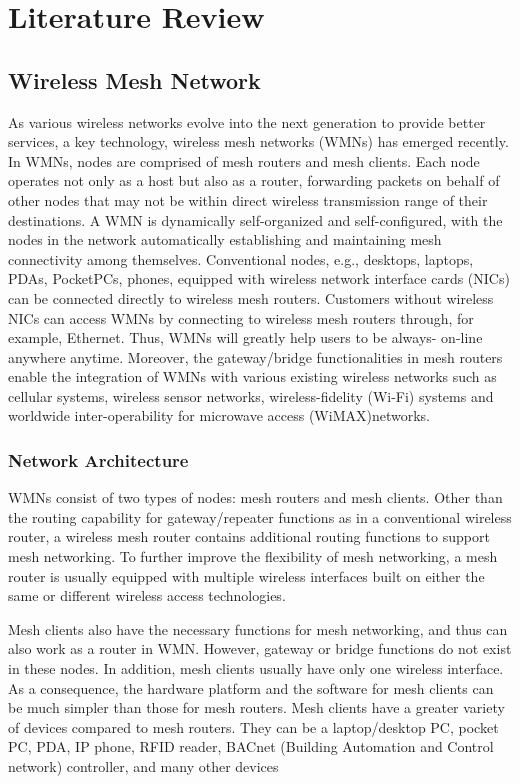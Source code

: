 \documentclass[12pt,a4paper]{report}
\begin{document}
\chapter{Literature Review}

\section{Wireless Mesh Network}
As various wireless networks evolve into the next generation to provide better services, a key technology, wireless mesh networks (WMNs) has emerged recently. In WMNs, nodes are comprised of mesh routers and mesh clients. Each node operates not only as a host but
also as a router, forwarding packets on behalf of other nodes that may not be within direct
wireless transmission range of their destinations. A WMN is dynamically self-organized and self-configured, with the nodes in the network automatically establishing and maintaining
mesh connectivity among themselves.
Conventional nodes, e.g., desktops, laptops, PDAs, PocketPCs, phones, equipped with
wireless network interface cards (NICs) can be connected directly to wireless mesh routers.
Customers without wireless NICs can access WMNs by connecting to wireless mesh
routers through, for example, Ethernet. Thus, WMNs will greatly help users to be always-
on-line anywhere anytime. Moreover, the gateway/bridge functionalities in mesh routers
enable the integration of WMNs with various existing wireless networks such as cellular
systems, wireless sensor networks, wireless-fidelity (Wi-Fi) systems and worldwide
inter-operability for microwave access (WiMAX)networks.


\subsection{Network Architecture}
WMNs consist of two types of nodes: mesh routers and mesh clients. Other than the routing
capability for gateway/repeater functions as in a conventional wireless router, a wireless mesh
router contains additional routing functions to support mesh networking. To further improve
the flexibility of mesh networking, a mesh router is usually equipped with multiple wireless
interfaces built on either the same or different wireless access technologies.

Mesh clients also have the necessary functions for mesh networking, and thus can also
work as a router in WMN. However, gateway or bridge functions do not exist in these nodes.
In addition, mesh clients usually have only one wireless interface. As a consequence, the
hardware platform and the software for mesh clients can be much simpler than those for mesh
routers. Mesh clients have a greater variety of devices compared to mesh routers. They can be
a laptop/desktop PC, pocket PC, PDA, IP phone, RFID reader, BACnet (Building Automation
and Control network) controller, and many other devices
\end{document}
